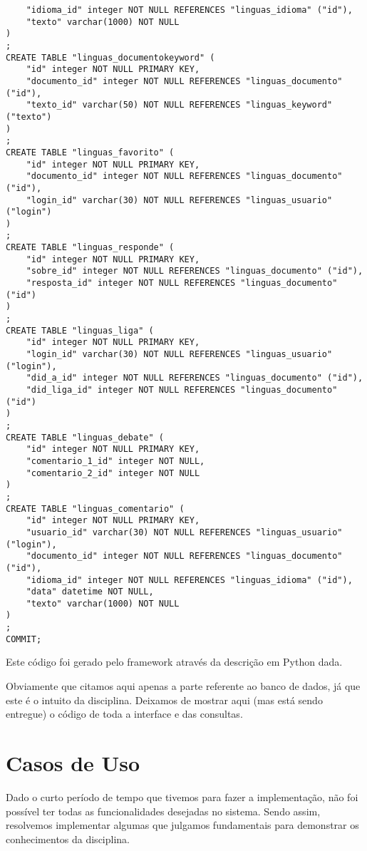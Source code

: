 \documentclass[12pt,a4paper]{article}
\begin{document}
\begin{verbatim}
    "idioma_id" integer NOT NULL REFERENCES "linguas_idioma" ("id"),
    "texto" varchar(1000) NOT NULL
)
;
CREATE TABLE "linguas_documentokeyword" (
    "id" integer NOT NULL PRIMARY KEY,
    "documento_id" integer NOT NULL REFERENCES "linguas_documento" ("id"),
    "texto_id" varchar(50) NOT NULL REFERENCES "linguas_keyword" ("texto")
)
;
CREATE TABLE "linguas_favorito" (
    "id" integer NOT NULL PRIMARY KEY,
    "documento_id" integer NOT NULL REFERENCES "linguas_documento" ("id"),
    "login_id" varchar(30) NOT NULL REFERENCES "linguas_usuario" ("login")
)
;
CREATE TABLE "linguas_responde" (
    "id" integer NOT NULL PRIMARY KEY,
    "sobre_id" integer NOT NULL REFERENCES "linguas_documento" ("id"),
    "resposta_id" integer NOT NULL REFERENCES "linguas_documento" ("id")
)
;
CREATE TABLE "linguas_liga" (
    "id" integer NOT NULL PRIMARY KEY,
    "login_id" varchar(30) NOT NULL REFERENCES "linguas_usuario" ("login"),
    "did_a_id" integer NOT NULL REFERENCES "linguas_documento" ("id"),
    "did_liga_id" integer NOT NULL REFERENCES "linguas_documento" ("id")
)
;
CREATE TABLE "linguas_debate" (
    "id" integer NOT NULL PRIMARY KEY,
    "comentario_1_id" integer NOT NULL,
    "comentario_2_id" integer NOT NULL
)
;
CREATE TABLE "linguas_comentario" (
    "id" integer NOT NULL PRIMARY KEY,
    "usuario_id" varchar(30) NOT NULL REFERENCES "linguas_usuario" ("login"),
    "documento_id" integer NOT NULL REFERENCES "linguas_documento" ("id"),
    "idioma_id" integer NOT NULL REFERENCES "linguas_idioma" ("id"),
    "data" datetime NOT NULL,
    "texto" varchar(1000) NOT NULL
)
;
COMMIT;
\end{verbatim}

Este código foi gerado pelo framework através da descrição em Python dada.

Obviamente que citamos aqui apenas a parte referente ao banco de dados, já que este é o intuito da disciplina. 
Deixamos de mostrar aqui (mas está sendo entregue) o código de toda a interface e das consultas.

\section{Casos de Uso}

Dado o curto período de tempo que tivemos para fazer a implementação, não foi possível ter todas as funcionalidades
desejadas no sistema. Sendo assim, resolvemos implementar algumas que julgamos fundamentais para demonstrar os conhecimentos
da disciplina.
\end{document}
